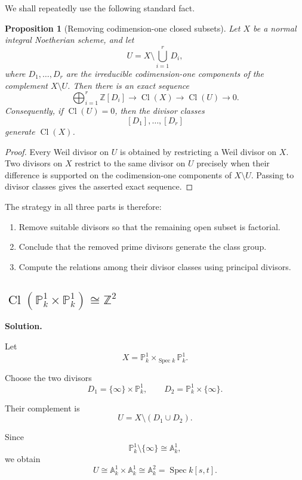 \documentclass[12pt,a4paper]{article}
\DeclareMathOperator{\Spec}{Spec}
\newtheorem{proposition}[theorem]{Proposition}
\newcommand{\Z}{\mathbb{Z}}
\newcommand{\Cl}{\operatorname{Cl}}
\providecommand{\Spec}{\operatorname{Spec}}
\providecommand{\A}{\mathbb A}
\providecommand{\Pj}{\mathbb P}
\theoremstyle{notespace}
\begin{document}
We shall repeatedly use the following standard fact.

\begin{proposition}[Removing codimension-one closed subsets]
	Let \(X\) be a normal integral Noetherian scheme, and let
	\[
	U=X\setminus \bigcup_{i=1}^{r}D_i,
	\]
	where \(D_1,\dots,D_r\) are the irreducible codimension-one components of the complement \(X\setminus U\). Then there is an exact sequence
	\[
	\bigoplus_{i=1}^{r}\Z[D_i]
	\longrightarrow
	\Cl(X)
	\longrightarrow
	\Cl(U)
	\longrightarrow 0.
	\]
	Consequently, if \(\Cl(U)=0\), then the divisor classes
	\[
	[D_1],\dots,[D_r]
	\]
	generate \(\Cl(X)\).
\end{proposition}

\begin{proof}
	Every Weil divisor on \(U\) is obtained by restricting a Weil divisor on \(X\). Two divisors on \(X\) restrict to the same divisor on \(U\) precisely when their difference is supported on the codimension-one components of \(X\setminus U\). Passing to divisor classes gives the asserted exact sequence.
\end{proof}

The strategy in all three parts is therefore:

\begin{enumerate}[label=\arabic*.]
	\item Remove suitable divisors so that the remaining open subset is factorial.
	\item Conclude that the removed prime divisors generate the class group.
	\item Compute the relations among their divisor classes using principal divisors.
\end{enumerate}

\subsection{\texorpdfstring{\(\Cl(\Pj^1_k\times \Pj^1_k)\cong \Z^2\)}{Cl(P1 x P1) = Z2}}

\textbf{Solution.}

Let
\[
X=\Pj^1_k\times_{\Spec k}\Pj^1_k.
\]

Choose the two divisors
\[
D_1=\{\infty\}\times \Pj^1_k,
\qquad
D_2=\Pj^1_k\times \{\infty\}.
\]

Their complement is
\[
U=X\setminus(D_1\cup D_2).
\]

Since
\[
\Pj^1_k\setminus\{\infty\}\cong \A^1_k,
\]
we obtain
\[
U
\cong
\A^1_k\times \A^1_k
\cong
\A^2_k
=
\Spec k[s,t].
\]
\end{document}
